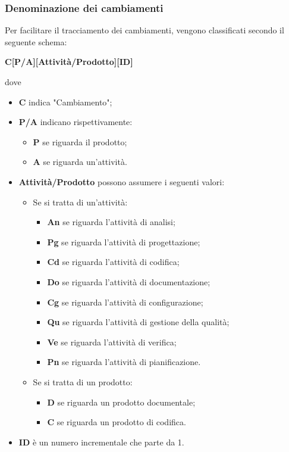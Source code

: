 \subsubsection{Denominazione dei cambiamenti}\label{NomeCambiamenti}
Per facilitare il tracciamento dei cambiamenti, vengono classificati secondo il seguente schema:
\begin{center}
	\textbf{C[P/A][Attività/Prodotto][ID]}
\end{center} 
dove
\begin{itemize}
	\item \textbf{C} indica "Cambiamento";
	\item \textbf{P/A} indicano rispettivamente:
	\begin{itemize}
		\item \textbf{P} se riguarda il prodotto;
		\item \textbf{A} se riguarda un'attività.
	\end{itemize}
	\item \textbf{Attività/Prodotto} possono assumere i seguenti valori:
	\begin{itemize}
		\item Se si tratta di un'attività:
		\begin{itemize}
			\item \textbf{An} se riguarda l'attività di analisi;
			\item \textbf{Pg} se riguarda l'attività di progettazione;
			\item \textbf{Cd} se riguarda l'attività di codifica;
			\item \textbf{Do} se riguarda l'attività di documentazione;
			\item \textbf{Cg} se riguarda l'attività di configurazione;
			\item \textbf{Qu} se riguarda l'attività di gestione della qualità;
			\item \textbf{Ve} se riguarda l'attività di verifica;
			\item \textbf{Pn} se riguarda l'attività di pianificazione.
		\end{itemize}
		\item Se si tratta di un prodotto:
		\begin{itemize}
			\item \textbf{D} se riguarda un prodotto documentale;
			\item \textbf{C} se riguarda un prodotto di codifica.
		\end{itemize}
	\end{itemize}
	\item \textbf{ID} è un numero incrementale che parte da 1.
\end{itemize}
